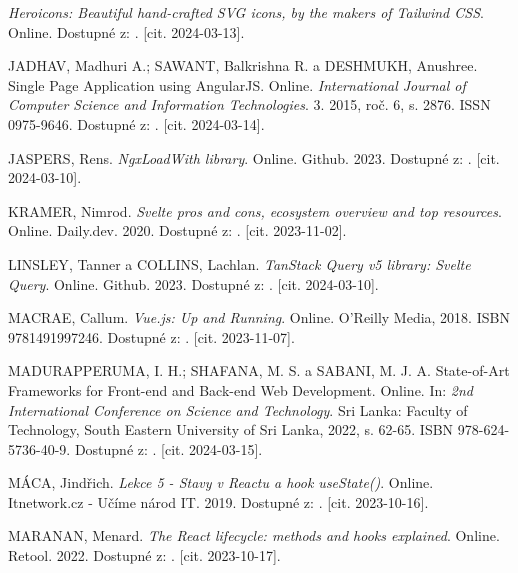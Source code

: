 \begin{thebibliography}{99}
\emph{Heroicons: Beautiful hand-crafted SVG icons, by the makers of Tailwind CSS}. Online. Dostupné z: . [cit. 2024-03-13].

\textsc{JADHAV}, Madhuri A.; \textsc{SAWANT}, Balkrishna R. a \textsc{DESHMUKH}, Anushree. Single Page Application using AngularJS. Online. \emph{International Journal of Computer Science and Information Technologies}. 3. 2015, roč. 6, s. 2876. ISSN 0975-9646. Dostupné z: . [cit. 2024-03-14].

\textsc{JASPERS}, Rens. \emph{NgxLoadWith library}. Online. Github. 2023. Dostupné z: . [cit. 2024-03-10].

\textsc{KRAMER}, Nimrod. \emph{Svelte pros and cons, ecosystem overview and top resources}. Online. Daily.dev. 2020. Dostupné z: . [cit. 2023-11-02].

\textsc{LINSLEY}, Tanner a \textsc{COLLINS}, Lachlan. \emph{TanStack Query v5 library: Svelte Query}. Online. Github. 2023. Dostupné z: . [cit. 2024-03-10].

\textsc{MACRAE}, Callum. \emph{Vue.js: Up and Running}. Online. O'Reilly Media, 2018. ISBN 9781491997246. Dostupné z: . [cit. 2023-11-07].

\textsc{MADURAPPERUMA}, I. H.; \textsc{SHAFANA}, M. S. a \textsc{SABANI}, M. J. A. State-of-Art Frameworks for Front-end and Back-end Web Development. Online. In: \emph{2nd International Conference on Science and Technology}. Sri Lanka: Faculty of Technology, South Eastern University of Sri Lanka, 2022, s. 62-65. ISBN 978-624-5736-40-9. Dostupné z: . [cit. 2024-03-15].

\textsc{MÁCA}, Jindřich. \emph{Lekce 5 - Stavy v Reactu a hook useState()}. Online. Itnetwork.cz - Učíme národ IT. 2019. Dostupné z: . [cit. 2023-10-16].

\textsc{MARANAN}, Menard. \emph{The React lifecycle: methods and hooks explained}. Online. Retool. 2022. Dostupné z: . [cit. 2023-10-17].


\end{thebibliography}
